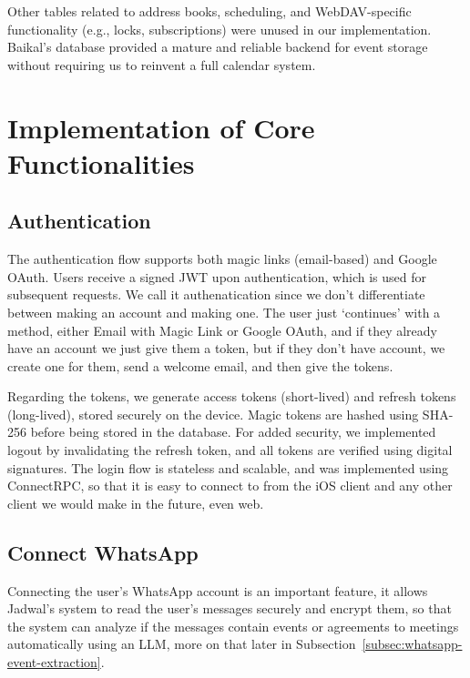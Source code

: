 Other tables related to address books, scheduling, and WebDAV-specific functionality (e.g., locks, subscriptions) were unused in our implementation. Baikal's database provided a mature and reliable backend for event storage without requiring us to reinvent a full calendar system.


\section{Implementation of Core Functionalities}

\subsection{Authentication}
\label{subsec:authentication}
The authentication flow supports both magic links (email-based) and Google OAuth. Users receive a signed JWT upon authentication, which is used for subsequent requests. We call it authenatication since we don't differentiate between making an account and making one. The user just `continues' with a method, either Email with Magic Link or Google OAuth, and if they already have an account we just give them a token, but if they don't have account, we create one for them, send a welcome email, and then give the tokens. 

Regarding the tokens, we generate access tokens (short-lived) and refresh tokens (long-lived), stored securely on the device. Magic tokens are hashed using SHA-256 before being stored in the database. For added security, we implemented logout by invalidating the refresh token, and all tokens are verified using digital signatures. The login flow is stateless and scalable, and was implemented using ConnectRPC, so that it is easy to connect to from the iOS client and any other client we would make in the future, even web.

\subsection{Connect WhatsApp}

Connecting the user's WhatsApp account is an important feature, it allows Jadwal's system to read the user's messages securely and encrypt them, so that the system can analyze if the messages contain events or agreements to meetings automatically using an LLM, more on that later in Subsection~\ref{subsec:whatsapp-event-extraction}.

